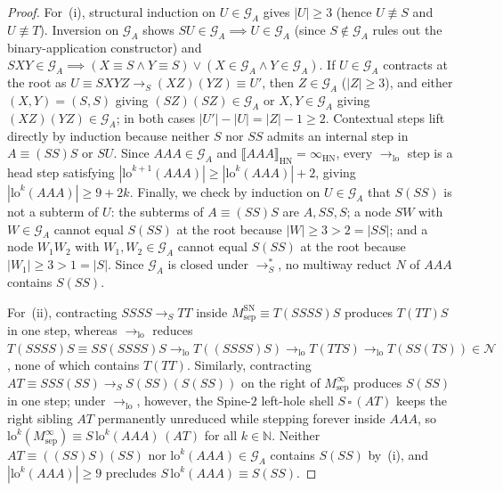 \documentclass[11pt,reqno]{amsart}
\numberwithin{equation}{section}
\theoremstyle{plain}
\theoremstyle{definition}
\theoremstyle{remark}
\newcommand{\SN}{\mathrm{SN}}
\newcommand{\HN}{\mathrm{HN}}
\newcommand{\sem}[1]{\llbracket #1 \rrbracket}
\newcommand{\redS}{\to_S}
\newcommand{\redSs}{\to_S^*}
\begin{document}
\begin{proof}
For~(i), structural induction on $U \in \mathcal{G}_A$ gives $|U| \ge 3$ (hence $U \not\equiv S$ and $U \not\equiv T$). Inversion on $\mathcal{G}_A$ shows $S U \in \mathcal{G}_A \implies U \in \mathcal{G}_A$ (since $S \notin \mathcal{G}_A$ rules out the binary-application constructor) and $S X Y \in \mathcal{G}_A \implies (X \equiv S \land Y \equiv S) \vee (X \in \mathcal{G}_A \land Y \in \mathcal{G}_A)$. If $U \in \mathcal{G}_A$ contracts at the root as $U \equiv S X Y Z \redS (X Z)(Y Z) \equiv U'$, then $Z \in \mathcal{G}_A$ ($|Z| \ge 3$), and either $(X, Y) = (S, S)$ giving $(S Z)(S Z) \in \mathcal{G}_A$ or $X, Y \in \mathcal{G}_A$ giving $(X Z)(Y Z) \in \mathcal{G}_A$; in both cases $|U'| - |U| = |Z| - 1 \ge 2$. Contextual steps lift directly by induction because neither $S$ nor $S S$ admits an internal step in $A \equiv (S S) S$ or $S U$. Since $A A A \in \mathcal{G}_A$ and $\sem{A A A}_{\HN} = \infty_{\HN}$, every $\to_{\mathrm{lo}}$ step is a head step satisfying $|\mathrm{lo}^{k+1}(A A A)| \ge |\mathrm{lo}^k(A A A)| + 2$, giving $|\mathrm{lo}^k(A A A)| \ge 9 + 2k$. Finally, we check by induction on $U \in \mathcal{G}_A$ that $S(S S)$ is not a subterm of $U$: the subterms of $A \equiv (S S) S$ are $A, S S, S$; a node $S W$ with $W \in \mathcal{G}_A$ cannot equal $S(S S)$ at the root because $|W| \ge 3 > 2 = |S S|$; and a node $W_1 W_2$ with $W_1, W_2 \in \mathcal{G}_A$ cannot equal $S(S S)$ at the root because $|W_1| \ge 3 > 1 = |S|$. Since $\mathcal{G}_A$ is closed under $\redSs$, no multiway reduct $N$ of $A A A$ contains $S(S S)$.

For~(ii), contracting $S S S S \redS T T$ inside $M_{\mathrm{sep}}^{\SN} \equiv T(S S S S)S$ produces $T(T T)S$ in one step, whereas $\to_{\mathrm{lo}}$ reduces $T(S S S S)S \equiv S S (S S S S) S \to_{\mathrm{lo}} T((S S S S)S) \to_{\mathrm{lo}} T(T T S) \to_{\mathrm{lo}} T(S S(T S)) \in \mathcal{N}$, none of which contains $T(T T)$. Similarly, contracting $A T \equiv S S S (S S) \redS S(S S)(S(S S))$ on the right of $M_{\mathrm{sep}}^{\infty}$ produces $S(S S)$ in one step; under $\to_{\mathrm{lo}}$, however, the Spine-$2$ left-hole shell $S\,\square\,(A T)$ keeps the right sibling $A T$ permanently unreduced while stepping forever inside $A A A$, so $\mathrm{lo}^k(M_{\mathrm{sep}}^{\infty}) \equiv S\,\mathrm{lo}^k(A A A)\,(A T)$ for all $k \in \mathbb{N}$. Neither $A T \equiv ((S S) S)(S S)$ nor $\mathrm{lo}^k(A A A) \in \mathcal{G}_A$ contains $S(S S)$ by~(i), and $|\mathrm{lo}^k(A A A)| \ge 9$ precludes $S\,\mathrm{lo}^k(A A A) \equiv S(S S)$.
\end{proof}
\end{document}
